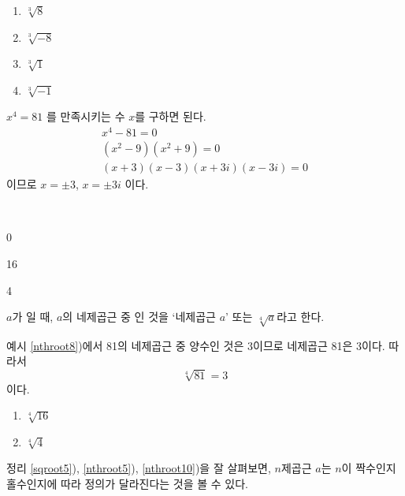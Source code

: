 \documentclass{oblivoir}
\begin{document}
%
\begin{enumerate}\label{nthroot7}
\item
\(\sqrt[3]8\)
\item
\(\sqrt[3]{-8}\)
\item
\(\sqrt[3]1\)
\item
\(\sqrt[3]{-1}\)
\end{enumerate}

\newpage
%
\label{nthroot8}
\vspace{-10pt}
\begin{mdframed}
\(x^4=81\)
를 만족시키는 수 \(x\)를 구하면 된다.
\begin{gather*}
x^4-81				=0\\
(x^2-9)(x^2+9)			=0\\
(x+3)(x-3)(x+3i)(x-3i)	=0
\end{gather*}
이므로 \(x=\pm3\), \(x=\pm3i\) 이다.
\end{mdframed}

%
\label{nthroot9}
\\[-10pt]
\begin{enumerate*}[itemjoin=\hspace{0.25\textwidth}]
\item
0
\item
16
\item
4
\end{enumerate*}

\bigskip

%
\begin{mdframed}
\label{nthroot10}
\(a\)가 일 때, \(a\)의 네제곱근 중 인 것을 `네제곱근 \(a\)' 또는 \(\sqrt[4]a\)라고 한다.
\end{mdframed}

%
\exam{}\label{nthroot11}
예시 \ref{nthroot8})에서 81의 네제곱근 중 양수인 것은 \(3\)이므로 네제곱근 81은 3이다.
따라서
\[\sqrt[4]{81}=3\]
이다.

%
\begin{enumerate}\label{nthroot12}
\item
\(\sqrt[4]{16}\)
\item
\(\sqrt[4]{4}\)
\end{enumerate}

\newpage
정리 \ref{sqroot5}), \ref{nthroot5}), \ref{nthroot10})을 잘 살펴보면, \(n\)제곱근 \(a\)는 \(n\)이 짝수인지 홀수인지에 따라 정의가 달라진다는 것을 볼 수 있다.
\end{document}
